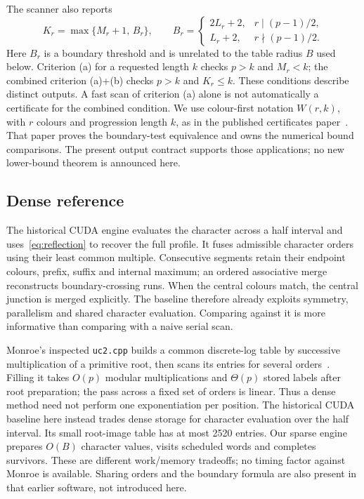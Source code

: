 \documentclass[11pt]{article}
\theoremstyle{definition}\newtheorem{remark}[theorem]{Remark}
\begin{document}
The scanner also reports
\begin{equation}\label{eq:K}
 K_r=\max\{M_r+1,\, B_r\},\qquad
 B_r=\begin{cases}
 2L_r+2,&r\mid(p-1)/2,\\
 L_r+2,&r\nmid(p-1)/2.
 \end{cases}
\end{equation}
Here $B_r$ is a boundary threshold and is unrelated to the table radius
$B$ used below. Criterion (a) for a requested length $k$ checks $p>k$ and
$M_r<k$; the combined criterion (a)+(b) checks $p>k$ and $K_r\le k$.
These conditions describe distinct outputs. A fast scan of criterion (a)
alone is not automatically a certificate for the combined condition.
We use colour-first notation $W(r,k)$, with $r$ colours and progression
length $k$, as in the published certificates paper~\cite{boundsv2}.
That paper proves the boundary-test equivalence and owns the numerical
bound comparisons. The present output contract supports those applications;
no new lower-bound theorem is announced here.

\subsection{Dense reference}
The historical CUDA engine evaluates the character across a half interval
and uses~\eqref{eq:reflection} to recover the full profile. It fuses
admissible character orders using their least common multiple. Consecutive
segments retain their endpoint colours, prefix, suffix and internal maximum;
an ordered associative merge reconstructs boundary-crossing runs. When the
central colours match, the central junction is merged explicitly.
The baseline therefore already exploits symmetry, parallelism and shared
character evaluation. Comparing against it is more informative than
comparing with a naive serial scan.

Monroe's inspected \texttt{uc2.cpp} builds a common discrete-log table by
successive multiplication of a primitive root, then scans its entries for
several orders~\cite{monroecode}. Filling it takes $O(p)$ modular
multiplications and $\Theta(p)$ stored labels after root preparation; the
pass across a fixed set of orders is linear. Thus a dense method need not
perform one exponentiation per position. The historical CUDA baseline here
instead trades dense storage for character evaluation over the half
interval. Its small root-image table has at most 2520 entries. Our sparse
engine prepares $O(B)$ character values, visits scheduled words and
completes survivors. These are different work/memory tradeoffs; no timing
factor against Monroe is available. Sharing orders and the boundary
formula are also present in that earlier software, not introduced here.
\end{document}
